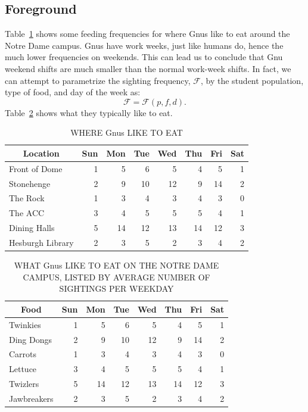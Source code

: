 \subsection{Foreground}

Table~\ref{tbl:bogus1} shows some feeding frequencies for where Gnus
like to eat around the Notre Dame campus.  Gnus have work weeks, just
like humans do, hence the much lower frequencies on weekends.  This
can lead us to conclude that Gnu weekend shifts are much smaller than
the normal work-week shifts.  In fact, we can attempt to parametrize the
sighting frequency, $\mathcal{F}$, by the student population, type of food, and
day of the week as:
\begin{equation}
  \mathcal{F} = \mathcal{F}(p,f,d).
\end{equation}
Table~\ref{tbl:bogus2} shows what they
typically like to eat.

\begin{table}[tpb]
  \begin{center}
    \caption{WHERE Gnus LIKE TO EAT \label{tbl:bogus1}}
    \begin{tabularx}{0.85\textwidth}{lrrrrrrr} \toprule
      \multicolumn{1}{c}{Location} & Sun & Mon & Tue & Wed & Thu & Fri & Sat \\ \midrule
      Front of Dome & 1 & 5 & 6 & 5 & 4 & 5 & 1 \\
      Stonehenge & 2 & 9 & 10 & 12 & 9 & 14 & 2 \\
      The Rock & 1 & 3 & 4 & 3 & 4 & 3 & 0 \\
      The ACC & 3 & 4 & 5 & 5 & 5 & 4 & 1 \\
      Dining Halls & 5 & 14 & 12 & 13 & 14 & 12 & 3 \\
      Hesburgh Library & 2 & 3 & 5 & 2 & 3 & 4 & 2 \\ \bottomrule
    \end{tabularx}
  \end{center}
\end{table}

\begin{table}[tpb]
  \setlength{\capwidth}{0.7\textwidth}
  \begin{center}
    \caption{WHAT Gnus LIKE TO EAT ON THE NOTRE DAME CAMPUS, LISTED
      BY AVERAGE NUMBER OF SIGHTINGS PER WEEKDAY
    \label{tbl:bogus2}
}
    \begin{tabular}{lrrrrrrr} \toprule
      \multicolumn{1}{c}{Food} & Sun & Mon & Tue & Wed & Thu & Fri & Sat \\ \midrule
      Twinkies & 1 & 5 & 6 & 5 & 4 & 5 & 1 \\
      Ding Dongs & 2 & 9 & 10 & 12 & 9 & 14 & 2 \\
      Carrots & 1 & 3 & 4 & 3 & 4 & 3 & 0 \\
      Lettuce & 3 & 4 & 5 & 5 & 5 & 4 & 1 \\
      Twizlers & 5 & 14 & 12 & 13 & 14 & 12 & 3 \\
      Jawbreakers & 2 & 3 & 5 & 2 & 3 & 4 & 2 \\ \bottomrule
    \end{tabular}
  \end{center}
\end{table}

